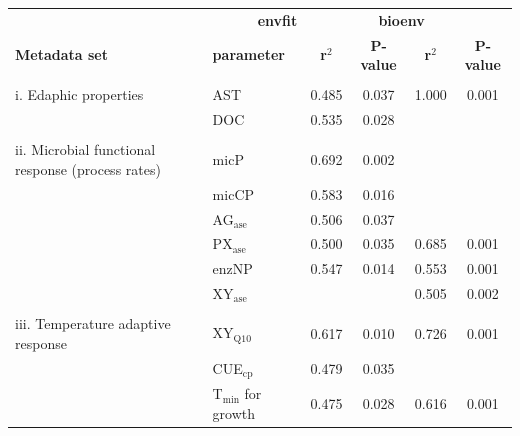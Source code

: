 \documentclass[
  letterpaper,
  DIV=11,
  numbers=noendperiod]{scrartcl}
\begin{document}
\begin{table}[H]
\centering\begingroup\fontsize{9}{11}\selectfont

\begin{tabular}{>{\raggedright\arraybackslash}p{24em}lcccc}

\multicolumn{2}{l}{\bgroup\fontsize{10}{12}\selectfont \textbf{b) Fungi}\egroup{}} & \multicolumn{2}{c}{\bgroup\fontsize{10}{12}\selectfont \textbf{envfit}\egroup{}} & \multicolumn{2}{c}{\bgroup\fontsize{10}{12}\selectfont \textbf{bioenv}\egroup{}} \\
\cmidrule(l{3pt}r{3pt}){1-2} \cmidrule(l{3pt}r{3pt}){3-4} \cmidrule(l{3pt}r{3pt}){5-6}
\begingroup\fontsize{9}{11}\selectfont \textbf{Metadata set}\endgroup & \begingroup\fontsize{9}{11}\selectfont \textbf{parameter}\endgroup & \begingroup\fontsize{9}{11}\selectfont \textbf{r$^{2}$}\endgroup & \begingroup\fontsize{9}{11}\selectfont \textbf{P-value}\endgroup & \begingroup\fontsize{9}{11}\selectfont \textbf{r$^{2}$}\endgroup & \begingroup\fontsize{9}{11}\selectfont \textbf{P-value}\endgroup\\
\midrule
\addlinespace[-0.7em]
\multicolumn{6}{l}{\textbf{}}\\
\hspace{1em}i. Edaphic properties & AST & 0.485 & 0.037 & 1.000 & 0.001\\
\hspace{1em} & DOC & 0.535 & 0.028 &  & \\
\midrule
\addlinespace[-0.7em]
\multicolumn{6}{l}{\textbf{}}\\
\hspace{1em}ii. Microbial functional response (process rates) & micP & 0.692 & 0.002 &  & \\
\hspace{1em} & micCP & 0.583 & 0.016 &  & \\
\hspace{1em} & AG$_{\mathrm{ase}}$ & 0.506 & 0.037 &  & \\
\hspace{1em} & PX$_{\mathrm{ase}}$ & 0.500 & 0.035 & 0.685 & 0.001\\
\hspace{1em} & enzNP & 0.547 & 0.014 & 0.553 & 0.001\\
\hspace{1em} & XY$_{\mathrm{ase}}$ &  &  & 0.505 & 0.002\\
\midrule
\addlinespace[-0.7em]
\multicolumn{6}{l}{\textbf{}}\\
\hspace{1em}iii. Temperature adaptive response & XY$_{\mathrm{Q10}}$ & 0.617 & 0.010 & 0.726 & 0.001\\
\hspace{1em} & CUE$_{\mathrm{cp}}$ & 0.479 & 0.035 &  & \\
\hspace{1em} & T$_{\mathrm{min}}$ for growth & 0.475 & 0.028 & 0.616 & 0.001\\
\bottomrule
\end{tabular}
\endgroup{}
\end{table}
\end{document}
